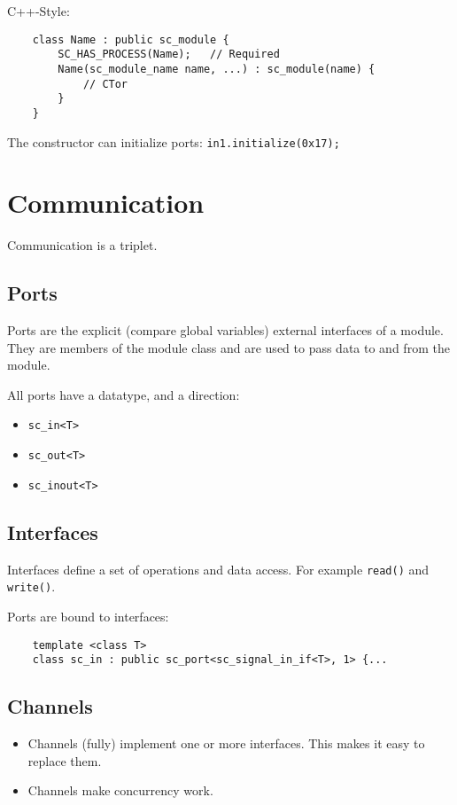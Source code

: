 C++-Style:
\begin{lstlisting}
    class Name : public sc_module {
        SC_HAS_PROCESS(Name);   // Required
        Name(sc_module_name name, ...) : sc_module(name) {
            // CTor
        }
    }
\end{lstlisting}

The constructor can initialize ports: \lstinline{in1.initialize(0x17);}

\section{Communication}
Communication is a triplet.
\subsection{Ports}
Ports are the explicit (compare global variables) external interfaces of a module. They are members of the module class and are used to pass data to and from the module.

All ports have a datatype, and a direction:
\begin{itemize}
    \item \lstinline{sc_in<T>}
    \item \lstinline{sc_out<T>}
    \item \lstinline{sc_inout<T>}
\end{itemize}

\subsection{Interfaces}
Interfaces define a set of operations and data access. 
For example \lstinline{read()} and \lstinline{write()}.

Ports are bound to interfaces:
\begin{lstlisting}
    template <class T>
    class sc_in : public sc_port<sc_signal_in_if<T>, 1> {...
\end{lstlisting}

\subsection{Channels}
\begin{itemize}
    \item Channels (fully) implement one or more interfaces. 
        This makes it easy to replace them.
    \item Channels make concurrency work.
\end{itemize} 

